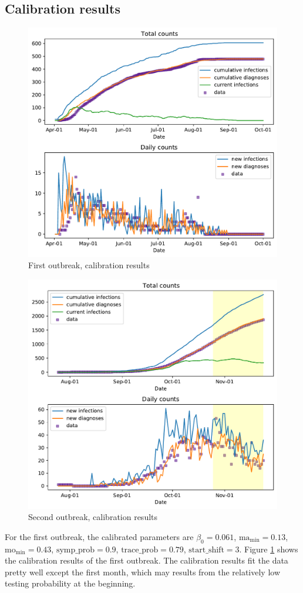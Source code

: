\subsection{Calibration results}
\begin{figure}[htbp]
	\centering
	\includegraphics[width=0.95\linewidth]{result/sg_calib1_result.pdf}
	\caption{First outbreak, calibration results}
	\label{cal1}
\end{figure}
\begin{figure}
	\centering
	\includegraphics[width=0.95\linewidth]{result/sg_calib2_predict.pdf}
	\caption{Second outbreak, calibration results}
	\label{cal2}
\end{figure}
For the first outbreak, the calibrated parameters are $\beta_0=0.061$, $\text{ma}_{\min}=0.13$, $\text{mo}_{\min}=0.43$, $\text{symp\_prob}=0.9$, $\text{trace\_prob}=0.79$, $\text{start\_shift}=3$. Figure \ref{cal1} shows the calibration results of the first outbreak. The calibration results fit the data pretty well except the first month, which may results from the relatively low testing probability at the beginning.

